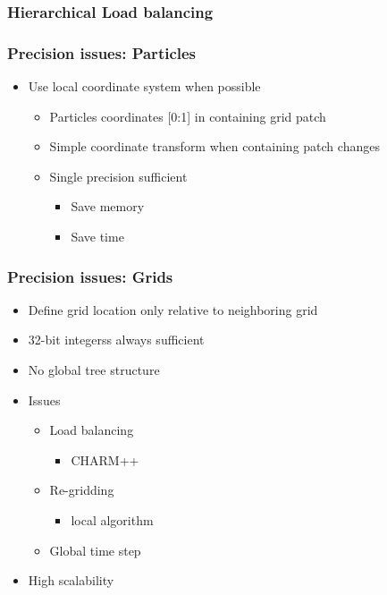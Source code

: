 \documentclass{beamer}
\begin{document}
    \begin{frame}[fragile] \frametitle{Hierarchical Load balancing}
\end{frame}

    \begin{frame}[fragile] \frametitle{Precision issues: Particles}
      \begin{itemize}
        \item Use local coordinate system when possible
        \begin{itemize}
          \item Particles coordinates [0:1] in containing grid patch
          \item Simple coordinate transform when containing patch changes
          \item Single precision sufficient
          \begin{itemize}
            \item Save memory
            \item Save time
          \end{itemize}
        \end{itemize}
      \end{itemize}
\end{frame}

    \begin{frame}[fragile] \frametitle{Precision issues: Grids}
      \begin{itemize}
        \item Define grid location only relative to neighboring grid
        \item 32-bit integerss always sufficient
        \item No global tree structure
        \item Issues
        \begin{itemize}
          \item Load balancing
          \begin{itemize}
            \item CHARM++
          \end{itemize}
          \item Re-gridding
          \begin{itemize}
            \item local algorithm
          \end{itemize}
          \item Global time step
        \end{itemize}
        \item High scalability
      \end{itemize}
\end{frame}
\end{document}
